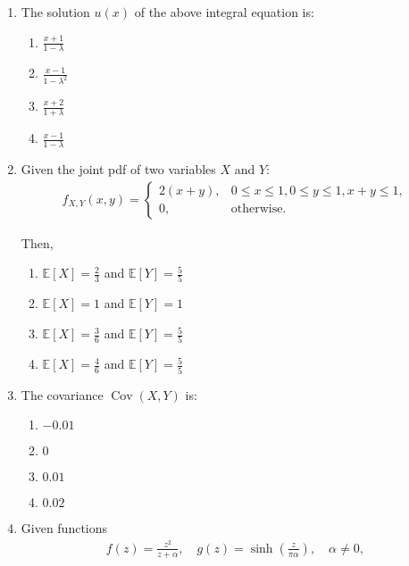 \documentclass[journal]{IEEEtran}
\numberwithin{equation}{enumi}
\numberwithin{figure}{enumi}
\begin{document}
\begin{enumerate}
\item
The solution $u(x)$ of the above integral equation is:
\hfill{}
\begin{multicols}{2}
\begin{enumerate}
\item $\displaystyle \frac{x + 1}{1 - \lambda}$
\item $\displaystyle \frac{x - 1}{1 - \lambda^2}$
\item $\displaystyle \frac{x + 2}{1 + \lambda}$
\item $\displaystyle \frac{x - 1}{1 - \lambda}$
\end{enumerate}
\end{multicols}

\item
Given the joint pdf of two variables $X$ and $Y$:
\begin{align}
    f_{X,Y}(x,y) = \begin{cases}
2(x+y), & 0 \leq x \leq 1, 0 \leq y \leq 1, x + y \leq 1, \\
0, & \text{otherwise}.
\end{cases}
\end{align}

Then,
\hfill{}
\begin{multicols}{2}
\begin{enumerate}
\item $\mathbb{E}[X] = \frac{2}{3}$ and $\mathbb{E}[Y] = \frac{5}{5}$
\item $\mathbb{E}[X] = 1$ and $\mathbb{E}[Y] = 1$
\item $\mathbb{E}[X] = \frac{3}{6}$ and $\mathbb{E}[Y] = \frac{5}{5}$
\item $\mathbb{E}[X] = \frac{4}{6}$ and $\mathbb{E}[Y] = \frac{5}{5}$
\end{enumerate}
\end{multicols}

\item
The covariance $\operatorname{Cov}(X,Y)$ is:
\hfill{}
\begin{multicols}{4}
\begin{enumerate}
\item $-0.01$
\item $0$
\item $0.01$
\item $0.02$
\end{enumerate}
\end{multicols}

\item
Given functions
\begin{align}
f(z) = \frac{z^2}{z + \alpha}, \quad g(z) = \sinh \left( \frac{z}{\pi \alpha} \right), \quad \alpha \neq 0,
\end{align}


\end{enumerate}
\end{document}

